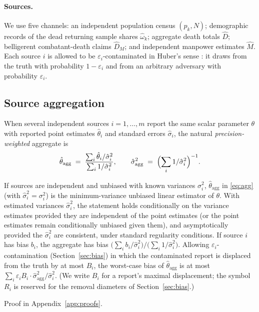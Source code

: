 \paragraph{Sources.} We use five channels: an independent population census $(p_k,N)$; demographic records of the dead returning sample shares $\hat\omega_k$; aggregate death totals $\hat D$; belligerent combatant-death claims $\hat D_M$; and independent manpower estimates $\hat M$. Each source $i$ is allowed to be $\varepsilon_i$-contaminated in Huber's sense \citep{huber1964,berger1986}: it draws from the truth with probability $1-\varepsilon_i$ and from an arbitrary adversary with probability $\varepsilon_i$.

\subsection{Source aggregation}\label{sec:aggregation}

When several independent sources $i=1,\dots,m$ report the same scalar parameter $\theta$ with reported point estimates $\hat\theta_i$ and standard errors $\hat\sigma_i$, the natural \emph{precision-weighted} aggregate is
\begin{equation}\label{eq:agg}
\hat\theta_{\mathrm{agg}} \;=\; \frac{\sum_i\hat\theta_i/\hat\sigma_i^2}{\sum_i 1/\hat\sigma_i^2},
\qquad
\hat\sigma_{\mathrm{agg}}^2 \;=\; \Bigl(\sum_i 1/\hat\sigma_i^2\Bigr)^{-1}.
\end{equation}

\begin{proposition}\label{prop:agg}
If sources are independent and unbiased with known variances $\sigma_i^2$, $\hat\theta_{\mathrm{agg}}$ in \eqref{eq:agg} (with $\hat\sigma_i^2=\sigma_i^2$) is the minimum-variance unbiased linear estimator of $\theta$. With estimated variances $\hat\sigma_i^2$, the statement holds conditionally on the variance estimates provided they are independent of the point estimates (or the point estimates remain conditionally unbiased given them), and asymptotically provided the $\hat\sigma_i^2$ are consistent, under standard regularity conditions. If source $i$ has bias $b_i$, the aggregate has bias $\bigl(\sum_i b_i/\hat\sigma_i^2\bigr)/\bigl(\sum_i 1/\hat\sigma_i^2\bigr)$. Allowing $\varepsilon_i$-contamination (Section~\ref{sec:bias}) in which the contaminated report is displaced from the truth by at most $B_i$, the worst-case bias of $\hat\theta_{\mathrm{agg}}$ is at most $\sum_i\varepsilon_i B_i\cdot \hat\sigma_{\mathrm{agg}}^2/\hat\sigma_i^2$. (We write $B_i$ for a report's maximal displacement; the symbol $R_i$ is reserved for the removal diameters of Section~\ref{sec:bias}.)
\end{proposition}
Proof in Appendix~\ref{app:proofs}.

